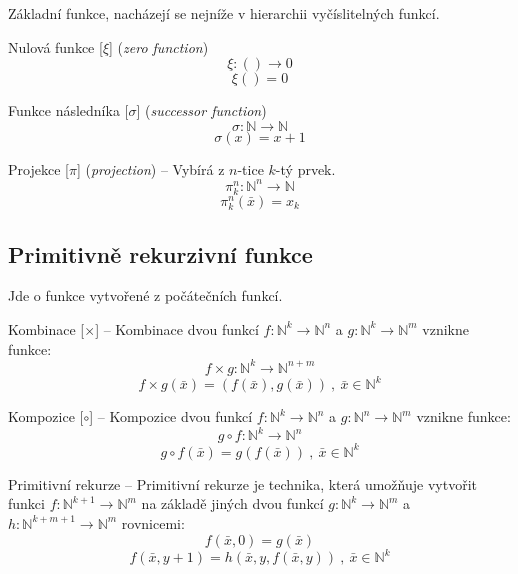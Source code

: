 Základní funkce, nacházejí se nejníže v hierarchii vyčíslitelných funkcí.

\begin{compactitem}
    \item Nulová funkce [$\xi$] (\textit{zero function})
    $$ \xi : () \rightarrow 0 $$
    $$ \xi() = 0 $$

    \item Funkce následníka [$\sigma$] (\textit{successor function})
    $$ \sigma : \mathbb{N} \rightarrow \mathbb{N} $$
    $$ \sigma(x) = x+1 $$

    \item Projekce [$\pi$] (\textit{projection}) -- Vybírá z $n$-tice $k$-tý prvek.
    $$ \pi_k^n : \mathbb{N}^n \rightarrow \mathbb{N} $$
    $$ \pi_k^n(\bar{x}) = x_k $$
\end{compactitem}

\subsection{Primitivně rekurzivní funkce}

Jde o funkce vytvořené z počátečních funkcí.

\begin{compactitem}
    \item Kombinace [$\times$] -- Kombinace dvou funkcí $f : \mathbb{N}^k \rightarrow \mathbb{N}^n$ a $g : \mathbb{N}^k \rightarrow \mathbb{N}^m$ vznikne funkce:
    $$ f \times g : \mathbb{N}^k \rightarrow \mathbb{N}^{n+m} $$
    $$ f \times g (\bar{x}) = (f(\bar{x}), g(\bar{x})) ~,~ \bar{x} \in \mathbb{N}^k $$

    \item Kompozice [$\circ$] -- Kompozice dvou funkcí $f : \mathbb{N}^k \rightarrow \mathbb{N}^n$ a $g : \mathbb{N}^n \rightarrow \mathbb{N}^m$ vznikne funkce:
    $$ g \circ f : \mathbb{N}^k \rightarrow \mathbb{N}^n $$
    $$ g \circ f (\bar{x}) = g(f(\bar{x})) ~,~ \bar{x} \in \mathbb{N}^k $$

    \item Primitivní rekurze -- Primitivní rekurze je technika, která umožňuje vytvořit funkci $f : \mathbb{N}^{k+1} \rightarrow \mathbb{N}^m$ na základě jiných dvou funkcí $g : \mathbb{N}^k \rightarrow \mathbb{N}^m$ a $h : \mathbb{N}^{k+m+1} \rightarrow \mathbb{N}^m$ rovnicemi:
    $$ f(\bar{x}, 0) = g(\bar{x}) $$
    $$ f(\bar{x}, y + 1) = h(\bar{x}, y, f(\bar{x}, y)) ~,~ \bar{x} \in \mathbb{N}^k $$
\end{compactitem}

